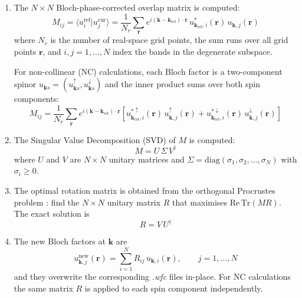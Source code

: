 \documentclass[a4paper,12pt]{report}
\begin{document}
\begin{enumerate}

\item The $N \times N$ Bloch-phase-corrected overlap matrix is computed:
\begin{equation}
  M_{ij} = \langle u^{\mathrm{ref}}_i | u^{\mathrm{cur}}_j \rangle
          = \frac{1}{N_r}\sum_{\pmb{r}}
            e^{i(\pmb{k}-\pmb{k}_{\mathrm{ref}})\cdot\pmb{r}}\,
            u^*_{\pmb{k}_{\mathrm{ref}},i}(\pmb{r})\,
            u_{\pmb{k},j}(\pmb{r})
  \label{eq:overlap_matrix}
\end{equation}
where $N_r$ is the number of real-space grid points, the sum runs over all
grid points $\pmb{r}$, and $i,j = 1,\ldots,N$ index the bands in the
degenerate subspace.

For non-collinear (NC) calculations, each Bloch factor is a two-component
spinor $u_{\pmb{k}s} = (u_{\pmb{k}s}^{\uparrow}, u_{\pmb{k}s}^{\downarrow})$
and the inner product sums over both spin components:
\begin{equation}
  M_{ij} = \frac{1}{N_r}\sum_{\pmb{r}} e^{i(\pmb{k}-\pmb{k}_{\mathrm{ref}})\cdot\pmb{r}}
            \left[
              u^{*\uparrow}_{\pmb{k}_{\mathrm{ref}},i}(\pmb{r})\,
              u^{\uparrow}_{\pmb{k},j}(\pmb{r})
            + u^{*\downarrow}_{\pmb{k}_{\mathrm{ref}},i}(\pmb{r})\,
              u^{\downarrow}_{\pmb{k},j}(\pmb{r})
            \right]
  \label{eq:overlap_matrix_nc}
\end{equation}

\item The Singular Value Decomposition (SVD) \cite{Golub2013} of $M$ is computed:
\begin{equation}
  M = U\,\Sigma\,V^{\dagger}
  \label{eq:svd}
\end{equation}
where $U$ and $V$ are $N \times N$ unitary matrices and
$\Sigma = \mathrm{diag}(\sigma_1, \sigma_2, \ldots, \sigma_N)$
with $\sigma_i \ge 0$.

\item The optimal rotation matrix is obtained from the
orthogonal Procrustes problem \cite{Schonemann1966}: find the $N \times N$
unitary matrix $R$ that maximises $\mathrm{Re}\,\mathrm{Tr}(M R)$.
The exact solution is
\begin{equation}
  R = V\,U^{\dagger}
  \label{eq:procrustes}
\end{equation}

\item The new Bloch factors at $\pmb{k}$ are
\begin{equation}
  u^{\mathrm{new}}_{\pmb{k},j}(\pmb{r}) = \sum_{i=1}^{N} R_{ij}\, u_{\pmb{k},i}(\pmb{r}),
  \qquad j = 1, \ldots, N
  \label{eq:rotation_application}
\end{equation}
and they overwrite the corresponding \emph{.wfc} files in-place.
For NC calculations the same matrix $R$ is applied to each spin component
independently.

\end{enumerate}
\end{document}
